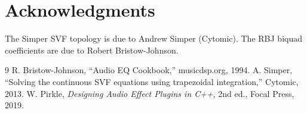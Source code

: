\documentclass[11pt,a4paper]{article}
\begin{document}
\section*{Acknowledgments}
The Simper SVF topology is due to Andrew Simper (Cytomic). The RBJ biquad coefficients are due to Robert Bristow-Johnson.

\begin{thebibliography}{9}
 R. Bristow-Johnson, ``Audio EQ Cookbook,'' musicdsp.org, 1994.
 A. Simper, ``Solving the continuous SVF equations using trapezoidal integration,'' Cytomic, 2013.
 W. Pirkle, \textit{Designing Audio Effect Plugins in C++}, 2nd ed., Focal Press, 2019.
\end{thebibliography}
\end{document}
